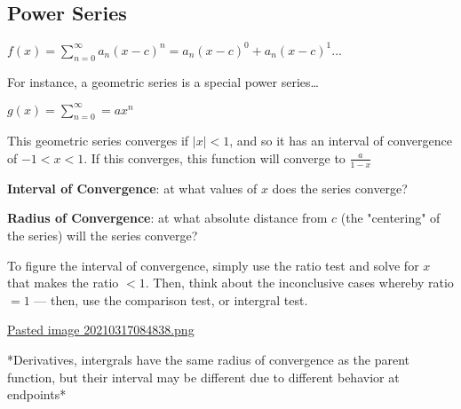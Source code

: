 \documentclass[letterpaper]{article}
\begin{document}
\subsection{Power Series}
\label{sec:org84332e4}
\(f(x) = \sum_{n=0}^{\infty} a_n(x-c)^n= a_n(x-c)^0 + a_n(x-c)^1 ...\)

For instance, a geometric series is a special power series\ldots{}

\(g(x) = \sum_{n=0}^{\infty} = ax^n\)

This geometric series converges if \(|x|<1\), and so it has an interval
of convergence of \(-1 < x < 1\). If this converges, this function will
converge to \(\frac{a}{1-x}\)

\textbf{Interval of Convergence}: at what values of \(x\) does the series
converge?

\textbf{Radius of Convergence}: at what absolute distance from \(c\) (the
"centering" of the series) will the series converge?

To figure the interval of convergence, simply use the ratio test and
solve for \(x\) that makes the ratio \(< 1\). Then, think about the
inconclusive cases whereby ratio \(= 1\) --- then, use the comparison
test, or intergral test.

\href{Pasted image 20210317084838.png.org}{Pasted image
20210317084838.png}

*Derivatives, intergrals have the same radius of convergence as the
parent function, but their interval may be different due to different
behavior at endpoints*
\end{document}
